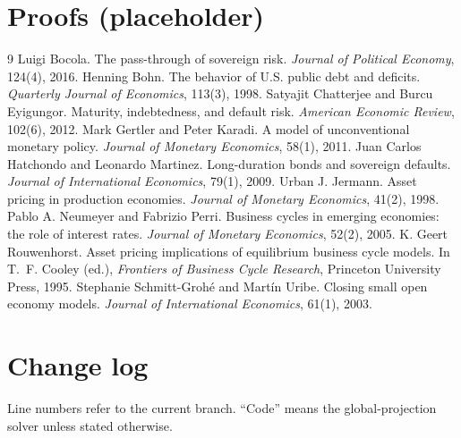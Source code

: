 \documentclass[11pt]{article}
\begin{document}
\appendix
\section{Proofs (placeholder)}
\label{app_proof_1}

\begin{thebibliography}{9}
 Luigi Bocola. The pass-through of sovereign risk. \emph{Journal of Political Economy}, 124(4), 2016.
 Henning Bohn. The behavior of U.S. public debt and deficits. \emph{Quarterly Journal of Economics}, 113(3), 1998.
 Satyajit Chatterjee and Burcu Eyigungor. Maturity, indebtedness, and default risk. \emph{American Economic Review}, 102(6), 2012.
 Mark Gertler and Peter Karadi. A model of unconventional monetary policy. \emph{Journal of Monetary Economics}, 58(1), 2011.
 Juan Carlos Hatchondo and Leonardo Martinez. Long-duration bonds and sovereign defaults. \emph{Journal of International Economics}, 79(1), 2009.
 Urban J. Jermann. Asset pricing in production economies. \emph{Journal of Monetary Economics}, 41(2), 1998.
 Pablo A. Neumeyer and Fabrizio Perri. Business cycles in emerging economies: the role of interest rates. \emph{Journal of Monetary Economics}, 52(2), 2005.
 K. Geert Rouwenhorst. Asset pricing implications of equilibrium business cycle models. In T.~F. Cooley (ed.), \emph{Frontiers of Business Cycle Research}, Princeton University Press, 1995.
 Stephanie Schmitt-Groh\'e and Mart\'in Uribe. Closing small open economy models. \emph{Journal of International Economics}, 61(1), 2003.
\end{thebibliography}

\clearpage
\section*{Change log}
\small
Line numbers refer to the current branch. ``Code'' means the global-projection solver unless stated otherwise.
\end{document}
